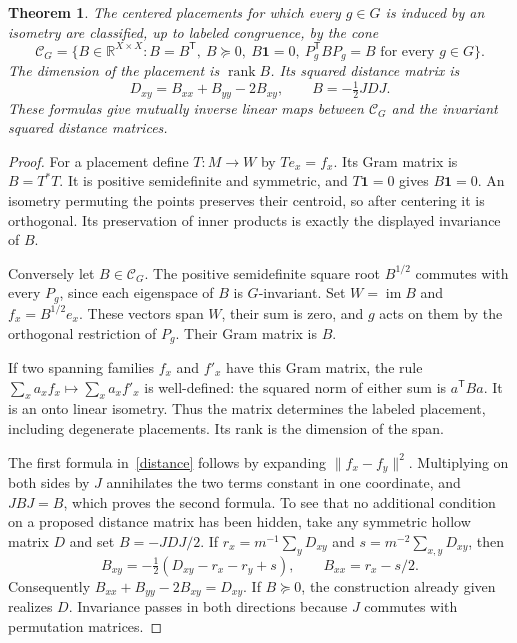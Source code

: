 \documentclass[11pt,a4paper]{article}
\newtheorem{theorem}{Theorem}
\newcommand{\R}{\mathbb R}
\newcommand{\one}{\mathbf 1}
\newcommand{\im}{\operatorname{im}}
\begin{document}
\begin{theorem}\label{gram}
The centered placements for which every $g\in G$ is induced by an isometry
are classified, up to labeled congruence, by the cone
\[
 \mathcal C_G=\{B\in\R^{X\times X}: B=B^{\mathsf T},\ B\succeq0,
       \ B\one=0,\ P_g^{\mathsf T}BP_g=B\text{ for every }g\in G\}.
\]
The dimension of the placement is $\operatorname{rank}B$. Its squared
distance matrix is
\begin{equation}\label{distance}
 D_{xy}=B_{xx}+B_{yy}-2B_{xy},
 \qquad B=-\tfrac12 JDJ.
\end{equation}
These formulas give mutually inverse linear maps between $\mathcal C_G$
and the invariant squared distance matrices.
\end{theorem}
\begin{proof}
For a placement define $T:M\to W$ by $Te_x=f_x$. Its Gram matrix is
$B=T^*T$. It is positive semidefinite and symmetric, and $T\one=0$ gives
$B\one=0$. An isometry permuting the points preserves their centroid, so
after centering it is orthogonal. Its preservation of inner products is
exactly the displayed invariance of $B$.

Conversely let $B\in\mathcal C_G$. The positive semidefinite square root
$B^{1/2}$ commutes with every $P_g$, since each eigenspace of $B$ is
$G$-invariant. Set $W=\im B$ and $f_x=B^{1/2}e_x$. These vectors span $W$,
their sum is zero, and $g$ acts on them by the orthogonal restriction of
$P_g$. Their Gram matrix is $B$.

If two spanning families $f_x$ and $f'_x$ have this Gram matrix, the rule
$\sum_x a_xf_x\mapsto\sum_x a_xf'_x$ is well-defined: the squared norm of
either sum is $a^{\mathsf T}Ba$. It is an onto linear isometry. Thus the
matrix determines the labeled placement, including degenerate placements.
Its rank is the dimension of the span.

The first formula in~\eqref{distance} follows by expanding
$\|f_x-f_y\|^2$. Multiplying on both sides by $J$ annihilates the two
terms constant in one coordinate, and $JBJ=B$, which proves the second
formula. To see that no additional condition on a proposed distance matrix
has been hidden, take any symmetric hollow matrix $D$ and set
$B=-JDJ/2$. If $r_x=m^{-1}\sum_yD_{xy}$ and
$s=m^{-2}\sum_{x,y}D_{xy}$, then
\[
 B_{xy}=-\tfrac12(D_{xy}-r_x-r_y+s),\qquad B_{xx}=r_x-s/2.
\]
Consequently $B_{xx}+B_{yy}-2B_{xy}=D_{xy}$. If $B\succeq0$, the
construction already given realizes $D$. Invariance passes in both
directions because $J$ commutes with permutation matrices.
\end{proof}
\end{document}
